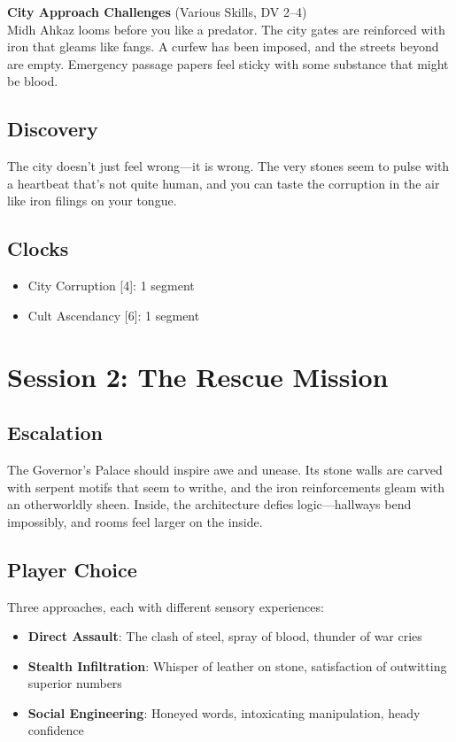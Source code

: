 \documentclass[11pt]{article}
\begin{document}
\textbf{City Approach Challenges} (Various Skills, DV 2–4)\\
Midh Ahkaz looms before you like a predator. The city gates are reinforced with iron that gleams like fangs. A curfew has been imposed, and the streets beyond are empty. Emergency passage papers feel sticky with some substance that might be blood.

\subsection*{Discovery}
The city doesn't just feel wrong—it is wrong. The very stones seem to pulse with a heartbeat that's not quite human, and you can taste the corruption in the air like iron filings on your tongue.

\subsection*{Clocks}
\begin{itemize}
    \item City Corruption [4]: 1 segment
    \item Cult Ascendancy [6]: 1 segment
\end{itemize}

\section{Session 2: The Rescue Mission}

\subsection*{Escalation}
The Governor's Palace should inspire awe and unease. Its stone walls are carved with serpent motifs that seem to writhe, and the iron reinforcements gleam with an otherworldly sheen. Inside, the architecture defies logic—hallways bend impossibly, and rooms feel larger on the inside.

\subsection*{Player Choice}
Three approaches, each with different sensory experiences:
\begin{itemize}
    \item \textbf{Direct Assault}: The clash of steel, spray of blood, thunder of war cries
    \item \textbf{Stealth Infiltration}: Whisper of leather on stone, satisfaction of outwitting superior numbers
    \item \textbf{Social Engineering}: Honeyed words, intoxicating manipulation, heady confidence
\end{itemize}
\end{document}

